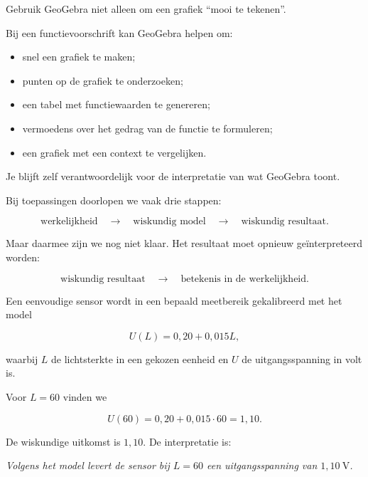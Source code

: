 \documentclass{ximera}
\begin{document}
\begin{fvdgeogebra}

    Gebruik GeoGebra niet alleen om een grafiek ``mooi te tekenen''.
    
    Bij een functievoorschrift kan GeoGebra helpen om:
    
    \begin{itemize}
    
        \item snel een grafiek te maken;
    
        \item punten op de grafiek te onderzoeken;
    
        \item een tabel met functiewaarden te genereren;
    
        \item vermoedens over het gedrag van de functie te formuleren;
    
        \item een grafiek met een context te vergelijken.
    
    \end{itemize}
    
    Je blijft zelf verantwoordelijk voor de interpretatie van wat GeoGebra toont.
    
    \end{fvdgeogebra}



Bij toepassingen doorlopen we vaak drie stappen:

\[
\boxed{\text{werkelijkheid}}
\quad\longrightarrow\quad
\boxed{\text{wiskundig model}}
\quad\longrightarrow\quad
\boxed{\text{wiskundig resultaat}}.
\]

Maar daarmee zijn we nog niet klaar. Het resultaat moet opnieuw geïnterpreteerd worden:

\[
\boxed{\text{wiskundig resultaat}}
\quad\longrightarrow\quad
\boxed{\text{betekenis in de werkelijkheid}}.
\]

\begin{voorbeeld}

Een eenvoudige sensor wordt in een bepaald meetbereik gekalibreerd met het model

\[
U(L)=0{,}20+0{,}015L,
\]

waarbij \(L\) de lichtsterkte in een gekozen eenheid en \(U\) de uitgangsspanning
in volt is.

Voor \(L=60\) vinden we

\[
U(60)=0{,}20+0{,}015\cdot60=1{,}10.
\]

De wiskundige uitkomst is \(1{,}10\). De interpretatie is:

\begin{center}
\emph{Volgens het model levert de sensor bij \(L=60\) een uitgangsspanning
van \(1{,}10\ \mathrm{V}\).}
\end{center}
\end{voorbeeld}
\end{document}
